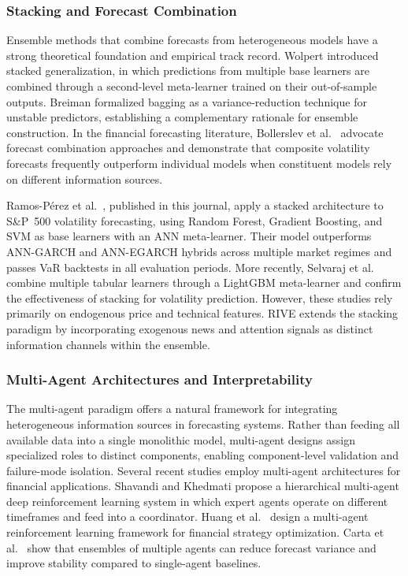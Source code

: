\documentclass[review]{elsarticle}
\begin{document}
\subsubsection{Stacking and Forecast Combination}\label{stacking}

Ensemble methods that combine forecasts from heterogeneous models have a strong theoretical foundation and empirical track record. Wolpert \cite{wolpert1992} introduced stacked generalization, in which predictions from multiple base learners are combined through a second-level meta-learner trained on their out-of-sample outputs. Breiman \cite{breiman1996} formalized bagging as a variance-reduction technique for unstable predictors, establishing a complementary rationale for ensemble construction. In the financial forecasting literature, Bollerslev et al.~\cite{bollerslev2016} advocate forecast combination approaches and demonstrate that composite volatility forecasts frequently outperform individual models when constituent models rely on different information sources.

Ramos-P\'{e}rez et al.~\cite{ramos2019}, published in this journal, apply a stacked architecture to S\&P~500 volatility forecasting, using Random Forest, Gradient Boosting, and SVM as base learners with an ANN meta-learner. Their model outperforms ANN-GARCH and ANN-EGARCH hybrids across multiple market regimes and passes VaR backtests in all evaluation periods. More recently, Selvaraj et al.~\cite{selvaraj2025} combine multiple tabular learners through a LightGBM meta-learner and confirm the effectiveness of stacking for volatility prediction. However, these studies rely primarily on endogenous price and technical features. RIVE extends the stacking paradigm by incorporating exogenous news and attention signals as distinct information channels within the ensemble.

\subsubsection{Multi-Agent Architectures and Interpretability}\label{multi-agent}

The multi-agent paradigm offers a natural framework for integrating heterogeneous information sources in forecasting systems. Rather than feeding all available data into a single monolithic model, multi-agent designs assign specialized roles to distinct components, enabling component-level validation and failure-mode isolation. Several recent studies employ multi-agent architectures for financial applications. Shavandi and Khedmati \cite{shavandi2022} propose a hierarchical multi-agent deep reinforcement learning system in which expert agents operate on different timeframes and feed into a coordinator. Huang et al.~\cite{huang2024} design a multi-agent reinforcement learning framework for financial strategy optimization. Carta et al.~\cite{carta2021} show that ensembles of multiple agents can reduce forecast variance and improve stability compared to single-agent baselines.
\end{document}
